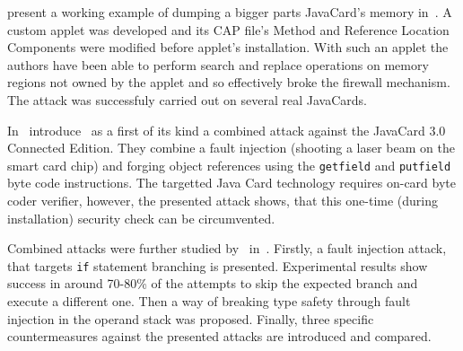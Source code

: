 \citeauthor{lanettrojan} present a working example of dumping a bigger parts JavaCard's memory in~\cite{lanettrojan}. A custom applet was developed and its CAP file's Method and Reference Location Components were modified before applet's installation. With such an applet the authors have been able to perform search and replace operations on memory regions not owned by the applet and so effectively broke the firewall mechanism. The attack was successfuly carried out on several real JavaCards.

    In~\cite{barbufirst} introduce~\citeauthor{barbufirst} as a first of its kind a combined attack against the JavaCard 3.0 Connected Edition. They combine a fault injection (shooting a laser beam on the smart card chip) and forging object references using the \texttt{getfield} and \texttt{putfield} byte code instructions. The targetted Java Card technology requires on-card byte coder verifier, however, the presented attack shows, that this one-time (during installation) security check can be circumvented.


    Combined attacks were further studied by~\citeauthor{barbusecond} in~\cite{barbusecond}. Firstly, a fault injection attack, that targets \texttt{if} statement branching is presented. Experimental results show success in around 70-80\% of the attempts to skip the expected branch and execute a different one. Then a way of breaking type safety through fault injection in the operand stack was proposed. Finally, three specific countermeasures against the presented attacks are introduced and compared.


